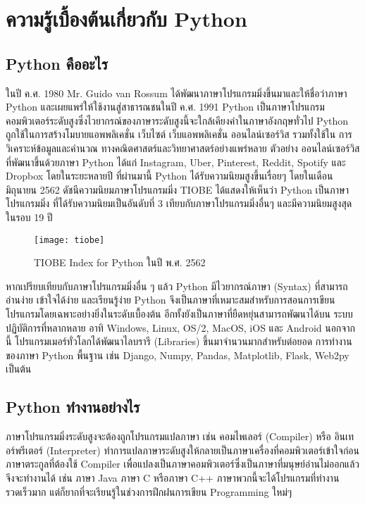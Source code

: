 \chapter{ความรู้เบื้องต้นเกี่ยวกับ Python}

\section{Python คืออะไร}

ในปี ค.ศ. 1980 Mr. Guido van Rossum ได้พัฒนาภาษาโปรแกรมมิ่งขึ้นมาและให้ชื่อว่าภาษา Python และเผยแพร่ให้ใช้งานสู่สาธารณชนในปี ค.ศ. 1991 \cite{Gui19} Python เป็นภาษาโปรแกรมคอมพิวเตอร์ระดับสูงซึ่งไวยากรณ์ของภาษาระดับสูงนี้จะใกล้เคียงคำในภาษาอังกฤษทั่วไป \cite{All15}  Python ถูกใช้ในการสร้างโมบายแอพพลิเคชั่น เว็บไซต์ เว็บแอพพลิเคชั่น ออนไลน์เซอร์วิส รวมทั้งใช้ใน การวิเคราะห์ข้อมูลและคำนวณ ทางคณิตศาสตร์และวิทยาศาสตร์อย่างแพร่หลาย  ตัวอย่าง ออนไลน์เซอร์วิสที่พัฒนาขึ้นด้วยภาษา Python ได้แก่ Instagram, Uber, Pinterest, Reddit, Spotify และ Dropbox \cite{Shu19} โดยในระยะหลายปี ที่ผ่านมานี้ Python ได้รับความนิยมสูงขึ้นเรื่อยๆ โดยในเดือนมิถุนายน 2562 ดัชนีความนิยมภาษาโปรแกรมมิ่ง TIOBE ได้แสดงให้เห็นว่า Python เป็นภาษาโปรแกรมมิ่ง ที่ได้รับความนิยมเป็นอันดับที่ 3 เทียบกับภาษาโปรแกรมมิ่งอื่นๆ และมีความนิยมสูงสุดในรอบ 19 ปี \cite{TIO19}  

\begin{figure}[h]
\caption{TIOBE Index for Python ในปี พ.ศ. 2562}
\texttt{[image: tiobe]}
\centering
\end{figure}



หากเปรียบเทียบกับภาษาโปรแกรมมิ่งอื่น ๆ แล้ว Python มีไวยากรณ์ภาษา (Syntax) ที่สามารถอ่านง่าย เข้าใจได้ง่าย และเรียนรู้ง่าย Python จึงเป็นภาษาที่เหมาะสมสำหรับการสอนการเขียนโปรแกรมโดยเฉพาะอย่างยิ่งในระดับเบื้องต้น อีกทั้งยังเป็นภาษาที่ยืดหยุ่นสามารถพัฒนาได้บน ระบบปฏิบัติการที่หลากหลาย อาทิ  Windows, Linux, OS/2, MacOS, iOS และ Android นอกจากนี้ โปรแกรมเมอร์ทั่วโลกได้พัฒนาไลบรารี (Libraries) ขึ้นมาจำนวนมากสำหรับต่อยอด การทำงานของภาษา Python พื้นฐาน เช่น Django, Numpy, Pandas, Matplotlib, Flask, Web2py เป็นต้น \cite{Pyt19}

\section{Python ทำงานอย่างไร}

ภาษาโปรแกรมมิ่งระดับสูงจะต้องถูกโปรแกรมแปลภาษา เช่น คอมไพเลอร์ (Compiler) หรือ อินเทอร์พรีเตอร์ (Interpreter) ทำการแปลภาษาระดับสูงให้กลายเป็นภาษาเครื่องที่คอมพิวเตอร์เข้าใจก่อน \cite{Mar13} ภาษาตระกูลที่ต้องใช้ Compiler เพื่อแปลงเป็นภาษาคอมพิวเตอร์ซึ่งเป็นภาษาที่มนุษย์อ่านไม่ออกแล้วจึงจะทำงานได้ เช่น ภาษา Java ภาษา C หรือภาษา C++ ภาษาพวกนี้จะได้โปรแกรมที่ทำงานรวดเร็วมาก แต่ก็ยากที่จะเรียนรู้ในช่วงการฝึกฝนการเขียน Programming ใหม่ๆ \cite{Pau16}

